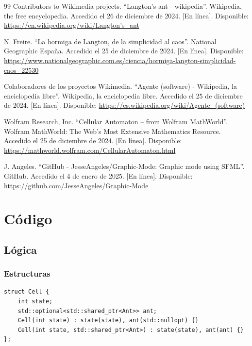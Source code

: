\documentclass[12pt,twoside]{article}
\begin{document}
	\clearpage
	\begin{thebibliography}{99}
	Contributors to Wikimedia projects. ``Langton's ant - wikipedia''. Wikipedia, the free encyclopedia. Accedido el 26 de diciembre de 2024. [En línea]. Disponible: \url{https://en.wikipedia.org/wiki/Langton's_ant}

	N. Freire. ``La hormiga de Langton, de la simplicidad al caos''. National Geographic España. Accedido el 25 de diciembre de 2024. [En línea]. Disponible: \url{https://www.nationalgeographic.com.es/ciencia/hormiga-langton-simplicidad-caos_22530}
		
	Colaboradores de los proyectos Wikimedia. ``Agente (software) - Wikipedia, la enciclopedia libre''. Wikipedia, la enciclopedia libre. Accedido el 25 de diciembre de 2024. [En línea]. Disponible: \url{https://es.wikipedia.org/wiki/Agente_(software)}
		
	Wolfram Research, Inc. ``Cellular Automaton -- from Wolfram MathWorld''. Wolfram MathWorld: The Web's Most Extensive Mathematics Resource. Accedido el 25 de diciembre de 2024. [En línea]. Disponible: \url{https://mathworld.wolfram.com/CellularAutomaton.html}
		
	J. Angeles. ``GitHub - JesseAngeles/Graphic-Mode: Graphic mode using SFML''. GitHub. Accedido el 4 de enero de 2025. [En línea]. Disponible: https://github.com/JesseAngeles/Graphic-Mode
		
	\end{thebibliography}
	
\clearpage
\section{Código}

\subsection{Lógica}

\subsubsection{Estructuras}

\begin{lstlisting}[caption={Cell}, label={lst:cppexample}]
struct Cell {
	int state;
	std::optional<std::shared_ptr<Ant>> ant;
	Cell(int state) : state(state), ant(std::nullopt) {}
	Cell(int state, std::shared_ptr<Ant>) : state(state), ant(ant) {} 
};
\end{lstlisting}
\end{document}
